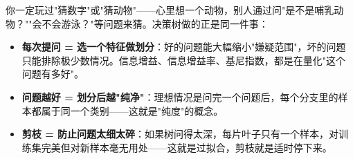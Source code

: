 \documentclass[a4paper,11pt]{ctexart}
\begin{document}
\begin{metaphorbox}
    你一定玩过"猜数字"或"猜动物"——心里想一个动物，别人通过问"是不是哺乳动物？""会不会游泳？"等问题来猜。决策树做的正是同一件事：
    \begin{itemize}
        \item \textbf{每次提问 = 选一个特征做划分}：好的问题能大幅缩小"嫌疑范围"，坏的问题只能排除极少数情况。信息增益、信息增益率、基尼指数，都是在量化"这个问题有多好"。
        \item \textbf{问题越好 = 划分后越"纯净"}：理想情况是问完一个问题后，每个分支里的样本都属于同一个类别——这就是"纯度"的概念。
        \item \textbf{剪枝 = 防止问题太细太碎}：如果树问得太深，每片叶子只有一个样本，对训练集完美但对新样本毫无用处——这就是过拟合，剪枝就是适时停下来。
    \end{itemize}
\end{metaphorbox}
\end{document}
